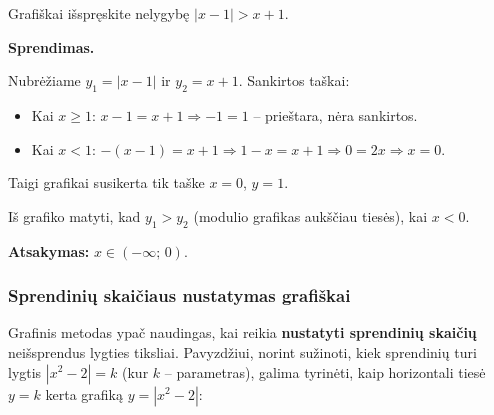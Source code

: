 \begin{example}
Grafiškai išspręskite nelygybę $|x - 1| > x + 1$.

\textbf{Sprendimas.}

Nubrėžiame $y_1 = |x-1|$ ir $y_2 = x+1$. Sankirtos taškai:
\begin{itemize}
    \item Kai $x \geq 1$: $x - 1 = x + 1 \Rightarrow -1 = 1$ – prieštara, nėra sankirtos.
    \item Kai $x < 1$: $-(x-1) = x+1 \Rightarrow 1-x = x+1 \Rightarrow 0 = 2x \Rightarrow x = 0$.
\end{itemize}

Taigi grafikai susikerta tik taške $x = 0$, $y = 1$.

\begin{center}
\end{center}

Iš grafiko matyti, kad $y_1 > y_2$ (modulio grafikas aukščiau tiesės), kai $x < 0$.

\textbf{Atsakymas:} $x \in (-\infty;\, 0)$.
\end{example}

\subsubsection*{Sprendinių skaičiaus nustatymas grafiškai}

Grafinis metodas ypač naudingas, kai reikia \textbf{nustatyti sprendinių skaičių} neišsprendus lygties tiksliai. Pavyzdžiui, norint sužinoti, kiek sprendinių turi lygtis $|x^2 - 2| = k$ (kur $k$ – parametras), galima tyrinėti, kaip horizontali tiesė $y = k$ kerta grafiką $y = |x^2 - 2|$:


